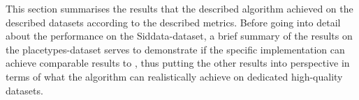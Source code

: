

This section summarises the results that the described algorithm achieved on the described datasets according to the described metrics. Before going into detail about the performance on the Siddata-dataset, a brief summary of the results on the placetypes-dataset serves to demonstrate if the specific implementation can achieve comparable results to \mainalgos, thus putting the other results into perspective in terms of what the algorithm can realistically achieve on dedicated high-quality datasets.

